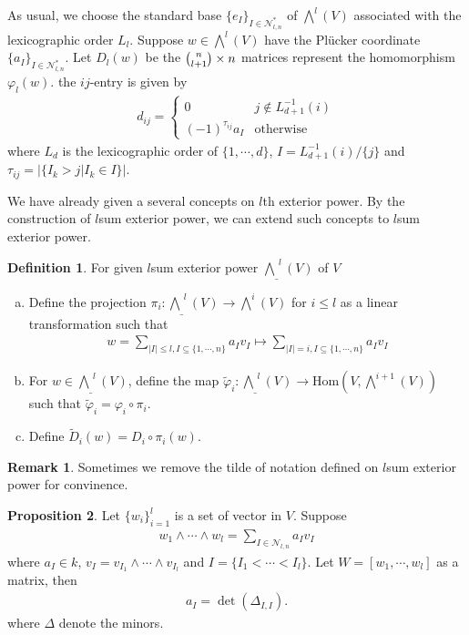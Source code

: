 \documentclass[10pt,UTF8]{article}
\theoremstyle{definition}
\renewcommand{\hom}{\text{Hom}}
\newtheorem{definition}{Definition}[section]
\newtheorem{proposition}[definition]{Proposition}
\newtheorem*{remark}{Remark}
\begin{document}
As usual, we choose the standard base $\{e_I\}_{I\in \mathcal{N}^*_{l,n}}$ of $\bigwedge^{l}(V)$ associated with the lexicographic order $L_l$.
Suppose $w\in \bigwedge^{l}(V)$ have the Plücker coordinate $\{a_I\}_{I\in \mathcal{N}^*_{l,n}}$.
Let $D_l(w)$ be the $\tbinom{n}{l+1}\times n$ matrices represent the homomorphism $\varphi_l(w)$.
the $ij$-entry is given by
\begin{align*}
  d_{ij} = 
  \begin{cases}
    0 & j\notin L_{d+1}^{-1}(i)\\
    (-1)^{\tau_{ij}}a_I & \text{otherwise}
  \end{cases}
\end{align*}
where $L_d$ is the lexicographic order of $\{1,\cdots,d\}$, $I =L_{d+1}^{-1}(i)/\{j\} $ and 
$\tau_{ij}= |\{I_k>j|I_k\in I\}|$.

We have already given a several concepts on $l$th exterior power. By the construction of $l$sum exterior power, we can extend such concepts to $l$sum exterior power.
\begin{definition}
  For given $l$sum exterior power $\underline{\bigwedge}^l(V)$ of $V$
  \begin{enumerate}[a)]
    \item Define the projection $\pi_i:\underline{\bigwedge}^l(V) \to \bigwedge^i(V)$ for $i\le l$ as a linear transformation such that 
    \begin{align*}
      w = \sum_{|I|\le l,I\subseteq\{1,\cdots,n\}} a_Iv_I \mapsto \sum_{|I|= i,I\subseteq\{1,\cdots,n\}} a_Iv_I 
    \end{align*}
    \item For $w\in\underline{\bigwedge}^l(V)$, define the map $\tilde{\varphi}_i:\underline{\bigwedge}^l(V) \to \hom\left(V,\bigwedge^{i+1}(V)\right)$ such that $\tilde{\varphi}_i = \varphi_i \circ \pi_i$.
    \item Define $\tilde{D}_i(w) =D_i\circ\pi_i(w) $.
  \end{enumerate}
\end{definition}


\begin{remark}
  Sometimes we remove the tilde of notation defined on $l$sum exterior power for convinence.
\end{remark}

\begin{proposition}
  Let $\{w_i\}_{i=1}^l$ is a set of vector in $V$. Suppose
  \begin{align*}
    w_1\wedge \cdots \wedge w_l = \sum_{I\in \mathcal{N}_{l,n}} a_Iv_I
  \end{align*}
  where $a_I\in k$, $v_I = v_{I_1}\wedge\cdots \wedge v_{I_l}$ and $I=\{I_1<\cdots<I_l\}$. Let $W=[w_1,\cdots,w_l]$ as a matrix, then
  \begin{align*}
    a_{I} = \det(\Delta_{I,I}).
  \end{align*}
  where $\Delta$ denote the minors.
\end{proposition}
\end{document}
